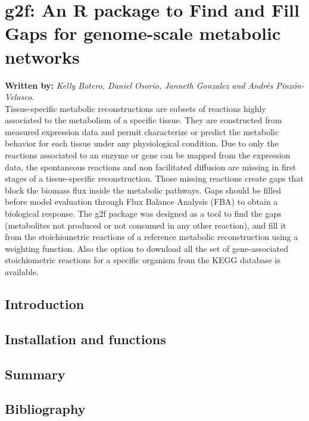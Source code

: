 \chapter{g2f: An R package to Find and Fill Gaps for genome-scale metabolic networks}
\textbf{Written by:} \textit{Kelly Botero, Daniel Osorio, Janneth Gonzalez and Andrés Pinzón-Velasco}.\\
Tissue-specific metabolic reconstructions are subsets of reactions highly associated to the metabolism of a specific tissue. They are constructed from measured expression data and permit characterize or predict the metabolic behavior for each tissue under any physiological condition. Due to only the reactions associated to an enzyme or gene can be mapped from the expression data, the spontaneous reactions and non facilitated diffusion are missing in first stages of a tissue-specific reconstruction. Those missing reactions create gaps that block the biomass flux inside the metabolic pathways. Gaps should be filled before model evaluation through Flux Balance Analysis (FBA) to obtain a biological response. The g2f package was designed as a tool to find the gaps (metabolites not produced or not consumed in any other reaction), and fill it from the stoichiometric reactions of a reference metabolic reconstruction using a weighting function. Also the option to download all the set of gene-associated stoichiometric reactions for a specific organism from the KEGG database is available.
\section{Introduction}
\section{Installation and functions}
\section{Summary}
\section{Bibliography}